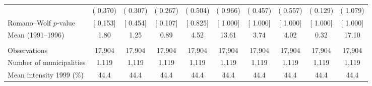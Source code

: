 \begin{tabular}{l*{9}{c}}
 & (       0.370) & (       0.307) & (       0.267) & (       0.504) & (       0.966) & (       0.457) & (       0.557) & (       0.129) & (       1.079) \\ 
Romano--Wolf $p$-value & [ 0.153] & [ 0.454] & [ 0.107] & [ 0.825] & [ 1.000] & [ 1.000] & [ 1.000] & [ 1.000] & [ 1.000] \\ 
Mean (1991--1996) &         1.80 &         1.25 &         0.89 &         4.52 &        13.61 &         3.74 &         4.02 &         0.32 &        17.10 \\ 
  & & & & & & & & & \\ 
Observations &       17,904 &       17,904 &       17,904 &       17,904 &       17,904 &       17,904 &       17,904 &       17,904 &       17,904 \\ 
Number of municipalities &        1,119 &        1,119 &        1,119 &        1,119 &        1,119 &        1,119 &        1,119 &        1,119 &        1,119 \\ 
Mean intensity 1999 (\%) &   44.4 &   44.4 &   44.4 &   44.4 &   44.4 &   44.4 &   44.4 &   44.4 &   44.4 \\ 
\bottomrule
\end{tabular}